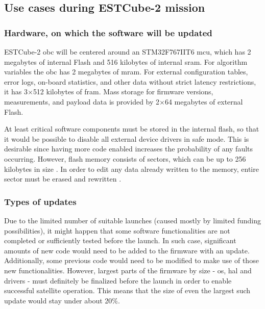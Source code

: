 \subsection{Use cases during ESTCube-2 mission}

\subsubsection{Hardware, on which the software will be updated}\label{s:hardware}

ESTCube-2 \gls{obc} will be centered around an STM32F767IIT6 \gls{mcu}, which has 2 megabytes of internal Flash and 516 kilobytes of internal \gls{sram}. For algorithm variables the \gls{obc} has 2 megabytes of \gls{mram}. For external configuration tables, error logs, on-board statistics, and other data without strict latency restrictions, it has 3$\times$512 kilobytes of \gls{fram}. Mass storage for firmware versions, measurements, and payload data is provided by 2$\times$64 megabytes of external Flash.
\cite{Haljaste2017}

At least critical software components must be stored in the internal flash, so that it would be possible to disable all external device drivers in safe mode. This is desirable since having more code enabled increases the probability of any faults occurring. However, flash memory consists of sectors, which can be up to 256 kilobytes in size \cite{STMicroelectronics2018}. In order to edit any data already written to the memory, entire sector must be erased and rewritten \cite{STMicroelectronics2018}.

\subsubsection{Types of updates}

Due to the limited number of suitable launches (caused mostly by limited funding possibilities), it might happen that some software functionalities are not completed or sufficiently tested before the launch. In such case, significant amounts of new code would need to be added to the firmware with an update. Additionally, some previous code would need to be modified to make use of those new functionalities. However, largest parts of the firmware by size - \gls{os}, \gls{hal} and drivers - must definitely be finalized before the launch in order to enable successful satellite operation. This means that the size of even the largest such update would stay under about 20\%.

